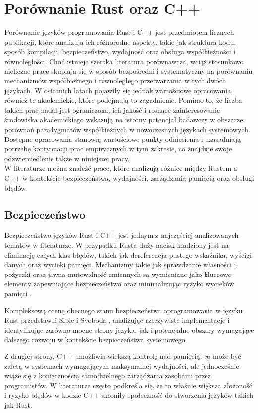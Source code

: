\section{Porównanie Rust oraz C++}
Porównanie języków programowania Rust i C++ jest przedmiotem licznych publikacji, które analizują ich różnorodne aspekty, takie jak struktura kodu, sposób kompilacji, bezpieczeństwo, wydajność oraz obsługa współbieżności i równoległości. Choć istnieje szeroka literatura porównawcza, wciąż stosunkowo nieliczne prace skupiają się w sposób bezpośredni i systematyczny na porównaniu mechanizmów współbieżnego i równoległego przetwarzania w tych dwóch językach. W ostatnich latach pojawiły się jednak wartościowe opracowania, również te akademickie, które podejmują to zagadnienie. Pomimo to, że liczba takich prac nadal jest ograniczona, ich jakość i rosnące zainteresowanie środowiska akademickiego wskazują na istotny potencjał badawczy w obszarze porównań paradygmatów współbieżnych w nowoczesnych językach systemowych. Dostępne opracowania stanowią wartościowe punkty odniesienia i uzasadniają potrzebę kontynuacji prac empirycznych w tym zakresie, co znajduje swoje odzwierciedlenie także w niniejszej pracy. \\
W literaturze można znaleźć prace, które analizują różnice między Rustem a C++ w kontekście bezpieczeństwa, wydajności, zarządzania pamięcią oraz obsługi błędów.

\subsection{Bezpieczeństwo}
\label{Bezpieczeństwo}
Bezpieczeństwo języków Rust i C++ jest jednym z najczęściej analizowanych tematów w literaturze. W przypadku Rusta duży nacisk kładziony jest na eliminację całych klas błędów, takich jak dereferencja pustego wskaźnika, wyścigi danych oraz wycieki pamięci. Mechanizmy takie jak sprawdzanie własności i pożyczki oraz jawna mutowalność zmiennych  są wymieniane jako kluczowe elementy zapewniające bezpieczeństwo oraz minimalizując ryzyko wycieków pamięci \cite{MigratingCtoRustforMemorySafety}. 

Kompleksową ocenę obecnego stanu bezpieczeństwa oprogramowania w języku Rust przedstawili Sible i Svoboda \cite{SecurityInRust}, analizując rzeczywiste implementacje i identyfikując zarówno mocne strony języka, jak i potencjalne obszary wymagające dalszego rozwoju w kontekście bezpieczeństwa systemowego. 

Z drugiej strony, C++ umożliwia większą kontrolę nad pamięcią, co może być zaletą w systemach wymagających maksymalnej wydajności, ale jednocześnie wiąże się z koniecznością samodzielnego zarządzania zasobami przez programistów. W literaturze \cite{RustDifferences, RustDifferences1} często podkreśla się, że to właśnie większa złożoność i ryzyko błędów w kodzie C++ skłoniły społeczność do stworzenia języków takich jak Rust.

